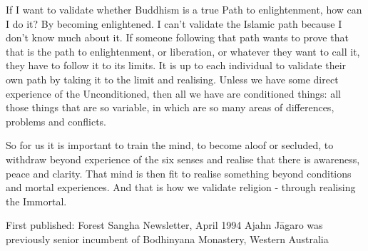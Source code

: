 If I want to validate whether Buddhism is a true Path to enlightenment, how can I do it? By becoming enlightened. I can't validate the Islamic path because I don't know much about it. If someone following that path wants to prove that that is the path to enlightenment, or liberation, or whatever they want to call it, they have to follow it to its limits. It is up to each individual to validate their own path by taking it to the limit and realising. Unless we have some direct experience of the Unconditioned, then all we have are conditioned things: all those things that are so variable, in which are so many areas of differences, problems and conflicts.

So for us it is important to train the mind, to become aloof or secluded, to withdraw beyond experience of the six senses and realise that there is awareness, peace and clarity. That mind is then fit to realise something beyond conditions and mortal experiences. And that is how we validate religion - through realising the Immortal.

First published: Forest Sangha Newsletter, April 1994
Ajahn Jāgaro was previously senior incumbent of Bodhinyana Monastery, Western Australia
